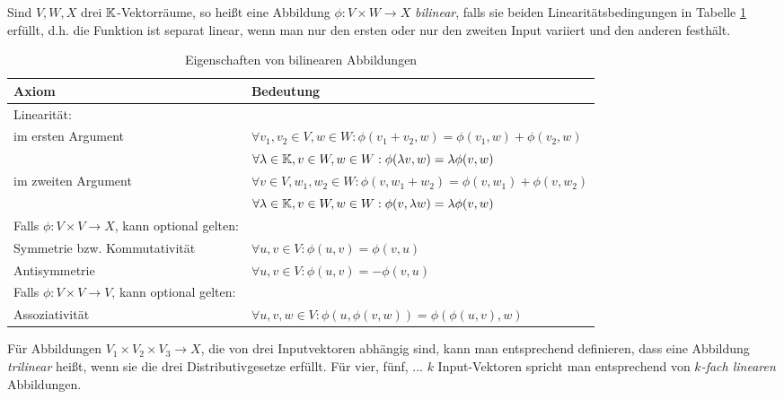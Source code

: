 \begin{definition}\label{bilineare_abb:def}
	Sind $V,W,X$ drei $\mathbb{K}$-Vektorräume, so heißt eine Abbildung $\phi: V\times W\to X$ \emph{bilinear}, falls sie beiden Linearitätsbedingungen in Tabelle \ref{bilineare_abb:def_table} erfüllt, d.h. die Funktion ist separat linear, wenn man nur den ersten oder nur den zweiten Input variiert und den anderen festhält.
	
	\begin{table}[!ht]
		\setlength\extrarowheight{10pt} %
		\hspace{-0.1\textwidth}
		\begin{tabularx}{1.2\textwidth}{p{6.5cm} p{9.5cm}}
			\toprule
			\textbf{Axiom}                  & \textbf{Bedeutung} \hspace{0.5cm} \\ 
			\midrule
			Linearität: \\
			\hspace{1cm}im ersten Argument  & $\forall v_1,v_2\in V, w\in W: \phi(v_1+v_2,w) = \phi(v_1,w) + \phi(v_2,w)$ \\
			& $\forall \lambda\in\mathbb{K}, v\in W, w\in W: \phi(\lambda v, w) = \lambda \phi(v,w)$ \\
			\hspace{1cm}im zweiten Argument & $\forall v\in V, w_1, w_2\in W: \phi(v,w_1+w_2) = \phi(v,w_1) + \phi(v,w_2)$ \\
			& $\forall \lambda\in\mathbb{K}, v\in W, w\in W: \phi(v, \lambda w) = \lambda \phi(v,w)$ \\
			Falls $\phi: V\times V \to X$, kann optional gelten: \\
			\hspace{1cm}Symmetrie bzw. Kommutativität & $\forall u,v\in V: \phi(u,v) = \phi(v,u)$ \\
			\hspace{1cm}Antisymmetrie & $\forall u,v\in V: \phi(u,v) = -\phi(v,u)$ \\
			Falls $\phi: V\times V\to V$, kann optional gelten: \\
			\hspace{1cm}Assoziativität & $\forall u,v,w\in V: \phi(u,\phi(v,w)) = \phi(\phi(u,v),w)$ \\
			\bottomrule
		\end{tabularx}
		\label{bilineare_abb:def_table}
		\caption{Eigenschaften von bilinearen Abbildungen}
	\end{table}
	
	Für Abbildungen $V_1\times V_2\times V_3\to X$, die von drei Inputvektoren abhängig sind, kann man entsprechend definieren, dass eine Abbildung \emph{trilinear} heißt, wenn sie die drei Distributivgesetze erfüllt. Für vier, fünf, ... $k$ Input-Vektoren spricht man entsprechend von \emph{$k$-fach linearen} Abbildungen.
\end{definition}


